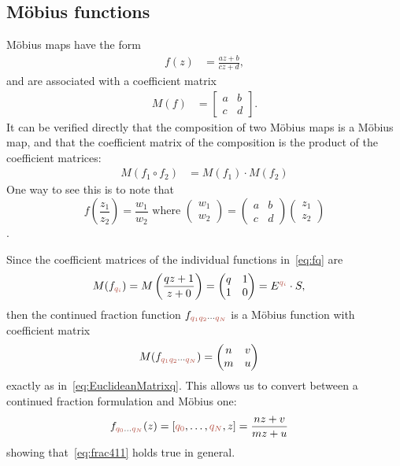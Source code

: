 \subsection{M\"obius functions}
\label{sec:moebiusdef}
M\"obius maps have the form
\begin{align}	f(z) &=  \frac{a z +b}{c z+ d},
\end{align}
and are associated with a coefficient matrix
\begin{align}
	M(f) &=
	\begin{bmatrix}
		a & b \\ c & d	\end{bmatrix}.
\end{align}
It can be verified directly that the composition of two M\"obius maps is a M\"obius map, and that the coefficient matrix of the composition is the product of the coefficient matrices:
\begin{align}
	M(f_1 \circ f_2) &= M(f_1 ) \cdot M( f_2)
\end{align}
One way to see this is to note that 
\begin{equation}
	f\left(\frac{z_1}{z_2}\right) =\frac{w_1}{w_2}  \mbox{ where } 	\begin{pmatrix}
		w_1 \\ w_2 
	\end{pmatrix} = 
	\begin{pmatrix}
		a & b \\ c & d
	\end{pmatrix} 
	\begin{pmatrix}
		z_1 \\ z_2
	\end{pmatrix}
\end{equation}.

Since the coefficient matrices of the individual  functions in~\eqref{eq:fq} are
\begin{align}
	M(f_\jqix{i})  &= M\left(\frac{q z+1}{z+0}\right)= \begin{pmatrix}
		q & 1 \\ 1 & 0
	\end{pmatrix}=  E^{\jqix{i}}\cdot S,
\end{align}
then the continued fraction function $	f_{\jqix{1}\jqix{2}\cdots\jqix{N}}$ is a M\"obius function with coefficient matrix 
\begin{align}
	M(f_{\jqix{1}\jqix{2}\cdots\jqix{N}})  &=	\begin{pmatrix} 
		n & v
		\\
		m & u
	\end{pmatrix}
\end{align}
exactly as in~\eqref{eq:EuclideanMatrixq}. This allows us to convert between a continued fraction formulation and M\"obius one:
\begin{align}
	f_{\jqix{0}\ldots \jqix{N}}(z) &=  [\jqix{0},\ldots ,\jqix{N}  , z]
	= \frac{nz+v}{mz+u} 
\end{align}
showing that~\eqref{eq:frac411} holds true in general. 

